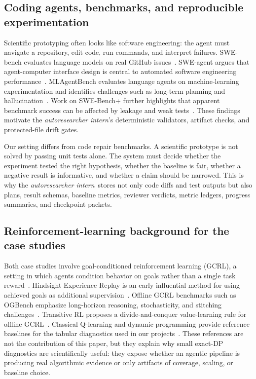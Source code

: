 \documentclass{article}
\newcommand{\intern}{\emph{autoresearcher intern}}
\begin{document}
\subsection{Coding agents, benchmarks, and reproducible experimentation}

Scientific prototyping often looks like software engineering: the agent must navigate a repository, edit code, run commands, and interpret failures. SWE-bench evaluates language models on real GitHub issues~\citep{jimenez2023swebench}. SWE-agent argues that agent-computer interface design is central to automated software engineering performance~\citep{yang2024sweagent}. MLAgentBench evaluates language agents on machine-learning experimentation and identifies challenges such as long-term planning and hallucination~\citep{huang2023mlagentbench}. Work on SWE-Bench+ further highlights that apparent benchmark success can be affected by leakage and weak tests~\citep{aleithan2024swebenchplus}. These findings motivate the \intern's deterministic validators, artifact checks, and protected-file drift gates.

Our setting differs from code repair benchmarks. A scientific prototype is not solved by passing unit tests alone. The system must decide whether the experiment tested the right hypothesis, whether the baseline is fair, whether a negative result is informative, and whether a claim should be narrowed. This is why the \intern\ stores not only code diffs and test outputs but also plans, result schemas, baseline metrics, reviewer verdicts, metric ledgers, progress summaries, and checkpoint packets.

\subsection{Reinforcement-learning background for the case studies}

Both case studies involve goal-conditioned reinforcement learning (GCRL), a setting in which agents condition behavior on goals rather than a single task reward~\citep{liu2022gcrlsurvey}. Hindsight Experience Replay is an early influential method for using achieved goals as additional supervision~\citep{andrychowicz2017her}. Offline GCRL benchmarks such as OGBench emphasize long-horizon reasoning, stochasticity, and stitching challenges~\citep{park2024ogbench}. Transitive RL proposes a divide-and-conquer value-learning rule for offline GCRL~\citep{park2025trl}. Classical Q-learning and dynamic programming provide reference baselines for the tabular diagnostics used in our projects~\citep{watkins1992qlearning,sutton2018rl}. These references are not the contribution of this paper, but they explain why small exact-DP diagnostics are scientifically useful: they expose whether an agentic pipeline is producing real algorithmic evidence or only artifacts of coverage, scaling, or baseline choice.
\end{document}
